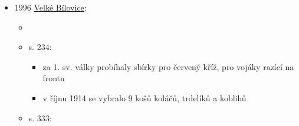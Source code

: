 \begin{itemize}
\begin{itemize}
\begin{itemize}
      \begin{itemize}
      \tightlist
      \item
        ostatní děti si libovaly, že se nikdy tak dobře nenajedly jako
        "dyž mamněnka ležali v kútě"
      \end{itemize}
    \end{itemize}
  \item
    s. 141:

    \begin{itemize}
    \tightlist
    \item
      trdelníky se zadělávaly z dobrého kynutého těsta, asi jako na
      vánočky, navinuté na válci, jímž se otáčí nad otevřeným ohněm z
      bukového dřeva
    \item
      zesnulý pedagog Josef Úlehla (1852-1933) ve svých pamětech píše:

      \begin{itemize}
      \tightlist
      \item
        Na rožni býval jako na ose dřevěný válec, na ten se namotávalo
        těsto a peklo se nad řežavým uhlím. Ten válec se jmenoval trdlo.
        Těsto bylo jemné, mastné, z něho se vytahovaly tenké praménky a
        namotávaly se těsně kolem trdla. Trdlem se neustále otáčelo a
        trdelník se pilně potíral rozlitým vaječným žloutkem. Upečený
        trdelník se posypával cukrem a rozemletým ořechem
        vlašským\ldots{} Při trdelníku poznáte, kdo je Slovák a kdo
        není. Slovák na trdelníku odvinuje jemně pramének od praménku,
        kdo není Slovák, často trdelník rozkrajuje a nabodává na
        vidličku
      \end{itemize}
    \item
      pak následuje recept na Skalickej trdelník
    \end{itemize}
  \end{itemize}
\item
  1996
  \href{https://www.digitalniknihovna.cz/mzk/uuid/uuid:8d626b40-4549-11ed-ab97-5ef3fc9bb22f}{Velké
  Bílovice}:

  \begin{itemize}
  \tightlist
  \item
  \item
    s. 234:

    \begin{itemize}
    \tightlist
    \item
      za 1. sv. války probíhaly sbírky pro červený kříž, pro vojáky
      razící na frontu
    \item
      v říjnu 1914 se vybralo 9 košů koláčů, trdelíků a koblihů
    \end{itemize}
  \item
    s. 333:


\end{itemize}
\end{itemize}
